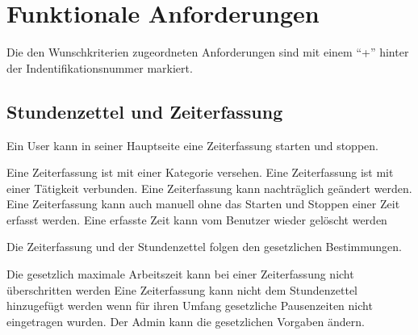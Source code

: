 \section{Funktionale Anforderungen}

Die den Wunschkriterien zugeordneten Anforderungen sind mit einem "`+"' hinter der Indentifikationsnummer markiert.

\subsection{Stundenzettel und Zeiterfassung}

\begin{requirements}
    Ein User kann in seiner Hauptseite eine Zeiterfassung starten und stoppen.
    \begin{requirements}
         Eine Zeiterfassung ist mit einer Kategorie versehen.
         Eine Zeiterfassung ist mit einer Tätigkeit verbunden.
         Eine Zeiterfassung kann nachträglich geändert werden.
         Eine Zeiterfassung kann auch manuell ohne das Starten und Stoppen einer Zeit erfasst werden.
         Eine erfasste Zeit kann vom Benutzer wieder gelöscht werden
    \end{requirements}

    Die Zeiterfassung und der Stundenzettel folgen den gesetzlichen Bestimmungen.
    \begin{requirements}
         Die gesetzlich maximale Arbeitszeit kann bei einer Zeiterfassung nicht überschritten werden
         Eine Zeiterfassung kann nicht dem Stundenzettel hinzugefügt werden wenn für ihren Umfang gesetzliche Pausenzeiten nicht eingetragen wurden.
         Der Admin kann die gesetzlichen Vorgaben ändern.
    \end{requirements}


\end{requirements}
